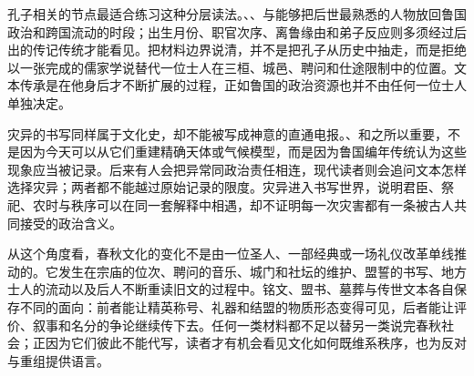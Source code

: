 孔子相关的节点最适合练习这种分层读法。、、与能够把后世最熟悉的人物放回鲁国政治和跨国流动的时段；出生月份、职官次序、离鲁缘由和弟子反应则多须经过后出的传记传统才能看见。把材料边界说清，并不是把孔子从历史中抽走，而是拒绝以一张完成的儒家学说替代一位士人在三桓、城邑、聘问和仕途限制中的位置。文本传承是在他身后才不断扩展的过程，正如鲁国的政治资源也并不由任何一位士人单独决定。

灾异的书写同样属于文化史，却不能被写成神意的直通电报。、和之所以重要，不是因为今天可以从它们重建精确天体或气候模型，而是因为鲁国编年传统认为这些现象应当被记录。后来有人会把异常同政治责任相连，现代读者则会追问文本怎样选择灾异；两者都不能越过原始记录的限度。灾异进入书写世界，说明君臣、祭祀、农时与秩序可以在同一套解释中相遇，却不证明每一次灾害都有一条被古人共同接受的政治含义。

从这个角度看，春秋文化的变化不是由一位圣人、一部经典或一场礼仪改革单线推动的。它发生在宗庙的位次、聘问的音乐、城门和社坛的维护、盟誓的书写、地方士人的流动以及后人不断重读旧文的过程中。铭文、盟书、墓葬与传世文本各自保存不同的面向：前者能让精英称号、礼器和结盟的物质形态变得可见，后者能让评价、叙事和名分的争论继续传下去。任何一类材料都不足以替另一类说完春秋社会；正因为它们彼此不能代写，读者才有机会看见文化如何既维系秩序，也为反对与重组提供语言。
